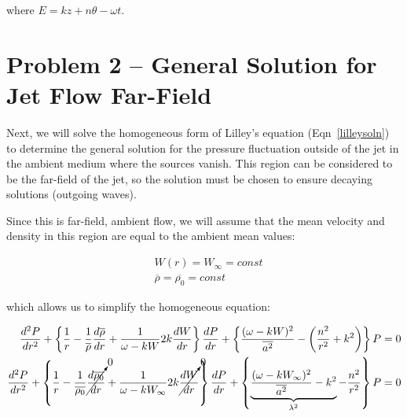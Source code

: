 \documentclass[]{aiaa-tc}%
\begin{document}
\noindent where $E=kz + n\theta -\omega t$.





\section{Problem 2 -- General Solution for Jet Flow Far-Field} \label{secprob2}

Next, we will solve the homogeneous form of Lilley's equation (Eqn~\ref{lilleysoln}) to determine the general solution for the pressure fluctuation outside of the jet in the ambient medium where the sources vanish.  This region can be considered to be the far-field of the jet, so the solution must be chosen to ensure decaying solutions (outgoing waves).

Since this is far-field, ambient flow, we will assume that the mean velocity and density in this region are equal to the ambient mean values:

\begin{equation}
\begin{split}
&W(r)= W_{\infty}=const \\
&\overline{\rho} = \overline{\rho_0} = const
\end{split}
\end{equation}

\noindent which allows us to simplify the homogeneous equation:

\begin{align*}
\dfrac{d^2P}{dr^2}
+ \left\{
    \dfrac{1}{r}
    - \dfrac{1}{\overline{\rho}}\frac{d \overline{\rho}}{dr}
    + \dfrac{1}{\omega - kW} 2k \dfrac{dW}{dr}
\right\} \dfrac{dP}{dr}
+ \left\{
    \dfrac{(\omega - kW)^2}{\overline{a^2}}
    - \left( \dfrac{n^2}{r^2} + k^2 \right)
\right\} P = 0 \\
\dfrac{d^2P}{dr^2}
  + \left\{
    \dfrac{1}{r}
    - \dfrac{1}{\overline{\rho_0}} \cancelto{0}{\frac{d \overline{\rho_0}}{dr}}
    + \dfrac{1}{\omega - kW_{\infty}} 2k \cancelto{0}{\dfrac{dW}{dr}}
\right\} \dfrac{dP}{dr}
 + \left\{
    \underbrace{ \dfrac{(\omega - k W_{\infty} )^2}{\overline{a^2} }
    - k^2 }_{\lambda^2}
    - \dfrac{n^2}{r^2}
\right\} P = 0
\end{align*}
\end{document}
